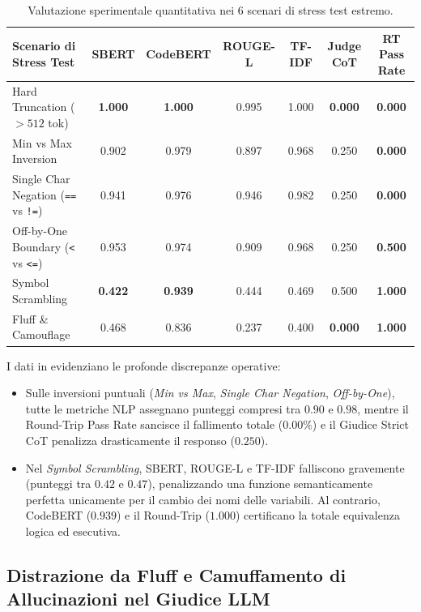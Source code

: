 \begin{table}[htbp]
\centering
\scriptsize
\setlength{\tabcolsep}{2.5pt}
\caption{Valutazione sperimentale quantitativa nei 6 scenari di stress test estremo.}
\label{tab:stress_test_data}
\begin{tabular}{lcccccc}
\toprule
\textbf{Scenario di Stress Test} & \textbf{SBERT} & \textbf{CodeBERT} & \textbf{ROUGE-L} & \textbf{TF-IDF} & \textbf{Judge CoT} & \textbf{RT Pass Rate} \\
\midrule
Hard Truncation ($>512$ tok) & \textbf{1.000} & \textbf{1.000} & 0.995 & 1.000 & \textbf{0.000} & \textbf{0.000} \\
Min vs Max Inversion & 0.902 & 0.979 & 0.897 & 0.968 & 0.250 & \textbf{0.000} \\
Single Char Negation (\texttt{==} vs \texttt{!=}) & 0.941 & 0.976 & 0.946 & 0.982 & 0.250 & \textbf{0.000} \\
Off-by-One Boundary (\texttt{<} vs \texttt{<=}) & 0.953 & 0.974 & 0.909 & 0.968 & 0.250 & \textbf{0.500} \\
Symbol Scrambling & \textbf{0.422} & \textbf{0.939} & 0.444 & 0.469 & 0.500 & \textbf{1.000} \\
Fluff \& Camouflage & 0.468 & 0.836 & 0.237 & 0.400 & \textbf{0.000} & \textbf{1.000} \\
\bottomrule
\end{tabular}
\end{table}

I dati in  evidenziano le profonde discrepanze operative:
\begin{itemize}
    \item Sulle inversioni puntuali (\emph{Min vs Max}, \emph{Single Char Negation}, \emph{Off-by-One}), tutte le metriche NLP assegnano punteggi compresi tra $0.90$ e $0.98$, mentre il Round-Trip Pass Rate sancisce il fallimento totale ($0.00\%$) e il Giudice Strict CoT penalizza drasticamente il responso ($0.250$).
    \item Nel \emph{Symbol Scrambling}, SBERT, ROUGE-L e TF-IDF falliscono gravemente (punteggi tra $0.42$ e $0.47$), penalizzando una funzione semanticamente perfetta unicamente per il cambio dei nomi delle variabili. Al contrario, CodeBERT ($0.939$) e il Round-Trip ($1.000$) certificano la totale equivalenza logica ed esecutiva.
\end{itemize}

\subsection{Distrazione da Fluff e Camuffamento di Allucinazioni nel Giudice LLM}
\label{subsec:judge_distraction_study}

